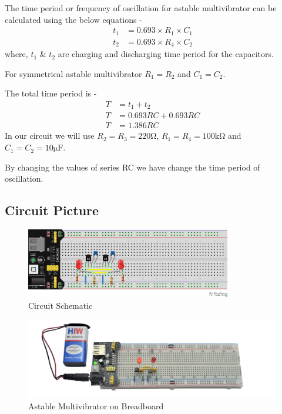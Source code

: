 The time period or frequency of oscillation for astable multivibrator can be calculated using the below equations - 
\begin{align*}
    t_1 &= 0.693 \times R_1 \times C_1 \\
    t_2 &= 0.693 \times R_4 \times C_2
\end{align*}
where, $t_1$ \& $t_2$ are charging and discharging time period for the capacitors.

For symmetrical astable multivibrator $R_1 = R_2$ and $C_1 = C_2$.

The total time period is -
\begin{align*}
    T &= t_1 + t_2 \\
    T &= 0.693RC + 0.693RC \\
    T &= 1.386RC
\end{align*}
In our circuit we will use $R_2 = R_3 = 220\si{\ohm}$, $R_1 = R_4 = 100\si{\kilo\ohm}$ and $C_1 = C_2 = 10\si{\micro\farad}$.

By changing the values of series RC we have change the time period of oscillation.
\subsection{Circuit Picture}
\begin{figure}[htp]
    \centering
    \includegraphics[width=0.8\textwidth]{Pictures/lesson_circuits/BJTs/lesson_4.png}
    \caption{Circuit Schematic}
    \label{fig:asm_sch}
\end{figure}
\begin{figure}[htp]
    \centering
    \includegraphics[width=\textwidth]{Pictures/lesson_circuits/BJTs/LC_6.png}
    \caption{Astable Multivibrator on Breadboard}
    \label{fig:asm_obb}
\end{figure}



